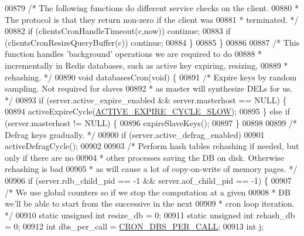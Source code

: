 \begin{DoxyCode}
{{{{{00879         \textcolor{comment}{/* The following functions do different service checks on the client.}
00880 \textcolor{comment}{         * The protocol is that they return non-zero if the client was}
00881 \textcolor{comment}{         * terminated. */}
00882         \textcolor{keywordflow}{if} (clientsCronHandleTimeout(c,now)) \textcolor{keywordflow}{continue};
00883         \textcolor{keywordflow}{if} (clientsCronResizeQueryBuffer(c)) \textcolor{keywordflow}{continue};
00884     \}
00885 \}
00886 
00887 \textcolor{comment}{/* This function handles 'background' operations we are required to do}
00888 \textcolor{comment}{ * incrementally in Redis databases, such as active key expiring, resizing,}
00889 \textcolor{comment}{ * rehashing. */}
00890 \textcolor{keywordtype}{void} databasesCron(\textcolor{keywordtype}{void}) \{
00891     \textcolor{comment}{/* Expire keys by random sampling. Not required for slaves}
00892 \textcolor{comment}{     * as master will synthesize DELs for us. */}
00893     \textcolor{keywordflow}{if} (server.active\_expire\_enabled && server.masterhost == NULL) \{
00894         activeExpireCycle(\hyperlink{server_8h_a62e5b6ba358ddcdef709e107e4d24744}{ACTIVE\_EXPIRE\_CYCLE\_SLOW});
00895     \} \textcolor{keywordflow}{else} \textcolor{keywordflow}{if} (server.masterhost != NULL) \{
00896         expireSlaveKeys();
00897     \}
00898 
00899     \textcolor{comment}{/* Defrag keys gradually. */}
00900     \textcolor{keywordflow}{if} (server.active\_defrag\_enabled)
00901         activeDefragCycle();
00902 
00903     \textcolor{comment}{/* Perform hash tables rehashing if needed, but only if there are no}
00904 \textcolor{comment}{     * other processes saving the DB on disk. Otherwise rehashing is bad}
00905 \textcolor{comment}{     * as will cause a lot of copy-on-write of memory pages. */}
00906     \textcolor{keywordflow}{if} (server.rdb\_child\_pid == -1 && server.aof\_child\_pid == -1) \{
00907         \textcolor{comment}{/* We use global counters so if we stop the computation at a given}
00908 \textcolor{comment}{         * DB we'll be able to start from the successive in the next}
00909 \textcolor{comment}{         * cron loop iteration. */}
00910         \textcolor{keyword}{static} \textcolor{keywordtype}{unsigned} \textcolor{keywordtype}{int} resize\_db = 0;
00911         \textcolor{keyword}{static} \textcolor{keywordtype}{unsigned} \textcolor{keywordtype}{int} rehash\_db = 0;
00912         \textcolor{keywordtype}{int} dbs\_per\_call = \hyperlink{server_8h_aaab0790ee1a625276dce078a9dbbe075}{CRON\_DBS\_PER\_CALL};
00913         \textcolor{keywordtype}{int} j;
}}}}}
\end{DoxyCode}

